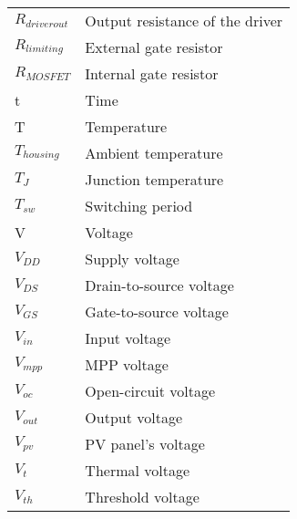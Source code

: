 \begin{tabular}{ll}
$R_{driver out}$ & Output resistance of the driver\\
$R_{limiting}$ & External gate resistor\\
$R_{MOSFET}$ & Internal gate resistor\\
t & Time\\
T & Temperature \\
$T_{housing}$ & Ambient temperature \\
$T_{J}$ & Junction temperature \\
$T_{sw}$ & Switching period \\
V & Voltage\\
$V_{DD}$ & Supply voltage\\
$V_{DS}$ & Drain-to-source voltage\\
$V_{GS}$ & Gate-to-source voltage\\
$V_{in}$ & Input voltage \\
$V_{mpp}$ & MPP voltage\\
$V_{oc}$ & Open-circuit voltage\\
$V_{out}$ & Output voltage \\
$V_{pv}$ & PV panel's voltage \\
$V_{t}$ & Thermal voltage \\
$V_{th}$ & Threshold voltage \\
\end{tabular}

